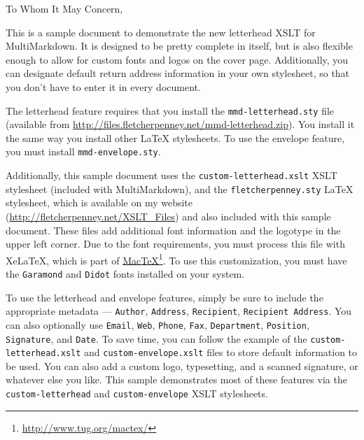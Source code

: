 
\def\mytitle{Test Letter}
\def\myauthor{John Doe}
\def\email{fletcher@example.net}
\def\address{123 Main St.  \\
Some City, ST  12345}
\def\recipient{Some Person}
\def\recipientaddress{321 Main St  \\
Some City, ST  54321}
\def\phone{(555) 555-5555}
\def\mydate{December 15, 2007}
\def\latexxslt{custom-letterhead.xslt}

\def\latexmode{memoir}
\def\blackandwhite{true}
To Whom It May Concern,

This is a sample document to demonstrate the new letterhead XSLT for
MultiMarkdown. It is designed to be pretty complete in itself, but is also
flexible enough to allow for custom fonts and logos on the cover page.
Additionally, you can designate default return address information in your own
stylesheet, so that you don't have to enter it in every document.

The letterhead feature requires that you install the \texttt{mmd-letterhead.sty} file
(available from \href{http://files.fletcherpenney.net/mmd-letterhead.zip}{http:\slash \slash files.fletcherpenney.net\slash mmd-letterhead.zip}). You
install it the same way you install other LaTeX stylesheets. To use the
envelope feature, you must install \texttt{mmd-envelope.sty}.

Additionally, this sample document uses the \texttt{custom-letterhead.xslt} XSLT
stylesheet (included with MultiMarkdown), and the \texttt{fletcherpenney.sty} LaTeX
stylesheet, which is available on my website
(\href{http://fletcherpenney.net/XSLT_Files}{http:\slash \slash fletcherpenney.net\slash XSLT\_Files}) and also included with this sample
document. These files add additional font information and the logotype in the
upper left corner. Due to the font requirements, you must process this file
with XeLaTeX, which is part of \href{http://www.tug.org/mactex/}{MacTeX}\footnote{\href{http://www.tug.org/mactex/}{http:\slash \slash www.tug.org\slash mactex\slash }}. To use
this customization, you must have the \texttt{Garamond} and \texttt{Didot} fonts installed
on your system.

To use the letterhead and envelope features, simply be sure to include the
appropriate metadata --- \texttt{Author}, \texttt{Address}, \texttt{Recipient}, \texttt{Recipient
Address}. You can also optionally use \texttt{Email}, \texttt{Web}, \texttt{Phone}, \texttt{Fax},
\texttt{Department}, \texttt{Position}, \texttt{Signature}, and \texttt{Date}. To save time, you can
follow the example of the \texttt{custom-letterhead.xslt} and \texttt{custom-envelope.xslt}
files to store default information to be used. You can also add a custom logo,
typesetting, and a scanned signature, or whatever else you like. This sample
demonstrates most of these features via the \texttt{custom-letterhead} and
\texttt{custom-envelope} XSLT stylesheets.

